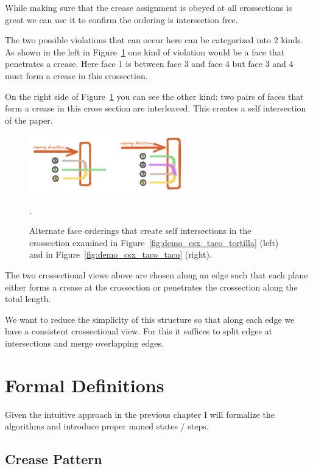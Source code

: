 While making sure that the crease assignment is obeyed at all crossections is great we can use it to confirm the ordering is intersection free.

The two possible violations that can occur here can be categorized into 2 kinds.
As shown in the left in Figure~\ref{fig:demo_csx_bad_ordering} one kind of violation would be a face that penetrates a crease.
Here face 1 is between face 3 and face 4 but face 3 and 4 must form a crease in this crossection.

On the right side of Figure~\ref{fig:demo_csx_bad_ordering} you can see the other kind: two pairs of faces that form a crease in this cross section are interleaved.
This creates a self intersection of the paper.
 
\begin{figure}[h]
\centering
\includegraphics[width=0.6\textwidth]{assets/demo_csx_bad_ordering.png}
\caption{Alternate face orderings that create self intersections in the crossection examined in Figure~\ref{fig:demo_csx_taco_tortilla} (left) and in Figure~\ref{fig:demo_csx_taco_taco} (right).}.
\label{fig:demo_csx_bad_ordering}
\end{figure}

The two crossectional views above are chosen along an edge such that each plane either forms a crease at the crossection or penetrates the crossection along the total length.

We want to reduce the simplicity of this structure so that along each edge we have a consistent crossectional view.
For this it suffices to split edges at intersections and merge overlapping edges.


\chapter{Formal Definitions}

Given the intuitive approach in the previous chapter I will formalize the algorithms and introduce
proper named states / steps.

\section{Crease Pattern}

